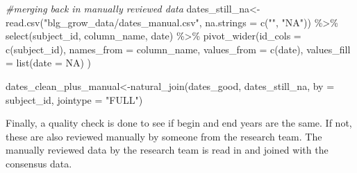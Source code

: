\documentclass[
]{article}
\newenvironment{Shaded}{\begin{snugshade}}{\end{snugshade}}
\newcommand{\AttributeTok}[1]{\textcolor[rgb]{0.77,0.63,0.00}{#1}}
\newcommand{\CommentTok}[1]{\textcolor[rgb]{0.56,0.35,0.01}{\textit{#1}}}
\newcommand{\ConstantTok}[1]{\textcolor[rgb]{0.00,0.00,0.00}{#1}}
\newcommand{\FunctionTok}[1]{\textcolor[rgb]{0.00,0.00,0.00}{#1}}
\newcommand{\NormalTok}[1]{#1}
\newcommand{\OtherTok}[1]{\textcolor[rgb]{0.56,0.35,0.01}{#1}}
\newcommand{\SpecialCharTok}[1]{\textcolor[rgb]{0.00,0.00,0.00}{#1}}
\newcommand{\StringTok}[1]{\textcolor[rgb]{0.31,0.60,0.02}{#1}}
\begin{document}
\begin{Shaded}
\begin{Highlighting}[]
\CommentTok{\#merging back in manually reviewed data }
\NormalTok{dates\_still\_na}\OtherTok{\textless{}{-}}\FunctionTok{read.csv}\NormalTok{(}\StringTok{"blg\_grow\_data/dates\_manual.csv"}\NormalTok{, }\AttributeTok{na.strings =} \FunctionTok{c}\NormalTok{(}\StringTok{""}\NormalTok{, }\StringTok{"NA"}\NormalTok{)) }\SpecialCharTok{\%\textgreater{}\%}
  \FunctionTok{select}\NormalTok{(subject\_id, column\_name, date) }\SpecialCharTok{\%\textgreater{}\%} 
  \FunctionTok{pivot\_wider}\NormalTok{(}\AttributeTok{id\_cols =} \FunctionTok{c}\NormalTok{(subject\_id),}
                \AttributeTok{names\_from =}\NormalTok{ column\_name, }
                \AttributeTok{values\_from =} \FunctionTok{c}\NormalTok{(date), }
                \AttributeTok{values\_fill =} \FunctionTok{list}\NormalTok{(}\AttributeTok{date =} \ConstantTok{NA}\NormalTok{) )}

\NormalTok{dates\_clean\_plus\_manual}\OtherTok{\textless{}{-}}\FunctionTok{natural\_join}\NormalTok{(dates\_good, dates\_still\_na, }\AttributeTok{by  =} \StringTok{\textquotesingle{}subject\_id\textquotesingle{}}\NormalTok{, }\AttributeTok{jointype =} \StringTok{"FULL"}\NormalTok{)}
\end{Highlighting}
\end{Shaded}

Finally, a quality check is done to see if begin and end years are the
same. If not, these are also reviewed manually by someone from the
research team. The manually reviewed data by the research team is read
in and joined with the consensus data.
\end{document}
